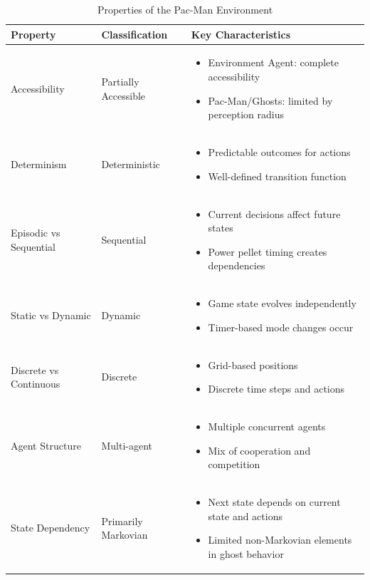 \documentclass[a4paper, 11pt]{article}
\begin{document}
\begin{table}[h]
\centering
\caption{Properties of the Pac-Man Environment}
\begin{tabular}{|p{4cm}|p{3cm}|p{7cm}|}
\hline
\textbf{Property} & \textbf{Classification} & \textbf{Key Characteristics} \\
\hline
Accessibility & Partially Accessible & 
\begin{itemize}
    \item Environment Agent: complete accessibility
    \item Pac-Man/Ghosts: limited by perception radius
\end{itemize} \\
\hline
Determinism & Deterministic & 
\begin{itemize}
    \item Predictable outcomes for actions
    \item Well-defined transition function
\end{itemize} \\
\hline
Episodic vs Sequential & Sequential & 
\begin{itemize}
    \item Current decisions affect future states
    \item Power pellet timing creates dependencies
\end{itemize} \\
\hline
Static vs Dynamic & Dynamic & 
\begin{itemize}
    \item Game state evolves independently
    \item Timer-based mode changes occur
\end{itemize} \\
\hline
Discrete vs Continuous & Discrete & 
\begin{itemize}
    \item Grid-based positions
    \item Discrete time steps and actions
\end{itemize} \\
\hline
Agent Structure & Multi-agent & 
\begin{itemize}
    \item Multiple concurrent agents
    \item Mix of cooperation and competition
\end{itemize} \\
\hline
State Dependency & Primarily Markovian & 
\begin{itemize}
    \item Next state depends on current state and actions
    \item Limited non-Markovian elements in ghost behavior
\end{itemize} \\
\hline
\end{tabular}
\end{table}
\end{document}
